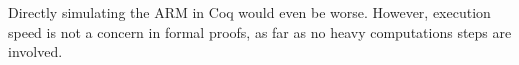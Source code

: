 Directly simulating the ARM in Coq would even be worse.
However, execution speed is not a concern in formal proofs,
as far as no heavy computations steps are involved.
%





